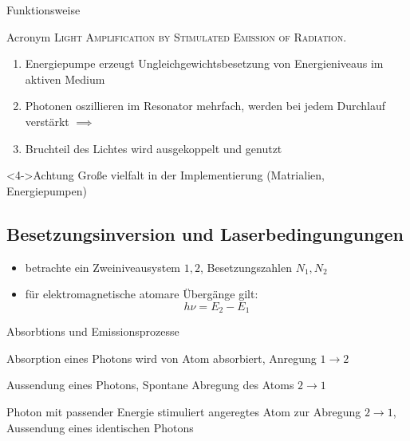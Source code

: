 \documentclass[10pt, aspectratio=169]{beamer}
\begin{document}
\begin{frame}{Funktionsweise}
  \begin{block}{Acronym}
    \textsc{Light Amplification by Stimulated Emission of Radiation.}
  \end{block}

  \begin{enumerate}
  \item<1-> Energiepumpe erzeugt Ungleichgewichtsbesetzung von
    Energieniveaus im aktiven Medium
  \item<2-> Photonen oszillieren im Resonator mehrfach, werden bei
    jedem Durchlauf verst\"arkt \(\implies\)
  \item<3-> Bruchteil des Lichtes wird ausgekoppelt und genutzt
  \end{enumerate}


  \begin{alertblock}<4->{Achtung} Gro\ss{}e vielfalt in der
    Implementierung (Matrialien, Energiepumpen)
  \end{alertblock}
\end{frame}

\subsection{Besetzungsinversion und Laserbedingungungen}
\begin{frame}
  \begin{itemize}
  \item betrachte ein Zweiniveausystem \(1,2\), Besetzungszahlen
    \(N_1, N_2\)
  \item f\"ur elektromagnetische atomare \"Uberg\"ange gilt:
    \begin{equation}
      h\nu = E_2 - E_1
    \end{equation}
  \end{itemize}
  \pause
  \begin{block}{Absorbtions und Emissionsprozesse}
    \begin{description}
    \item<2->[Absorption] Absorption eines Photons wird von Atom
      absorbiert, Anregung \(1\rightarrow 2\)
    \item<3->[Spontane Emission] Aussendung eines Photons, Spontane
      Abregung des Atoms \(2\rightarrow 1\)

    \item<4->[Stimulierte Emission] Photon mit passender
      Energie stimuliert angeregtes
      Atom zur Abregung \(2\rightarrow 1\), Aussendung eines identischen
      Photons
    \end{description}
  \end{block}
\end{frame}
\end{document}
